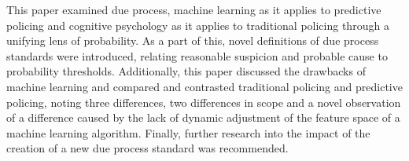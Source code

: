 \documentclass[12pt]{article} %
\begin{document}
This paper examined due process, machine learning as it applies to predictive policing and cognitive psychology as it applies to traditional policing through a unifying lens of probability. As a part of this, novel definitions of due process standards were introduced, relating reasonable suspicion and probable cause to probability thresholds. Additionally, this paper discussed the drawbacks of machine learning and compared and contrasted traditional policing and predictive policing, noting three differences, two differences in scope and a novel observation of a difference caused by the lack of dynamic adjustment of the feature space of a machine learning algorithm. Finally, further research into the impact of the creation of a new due process standard was recommended. 
\newpage




\end{document}

